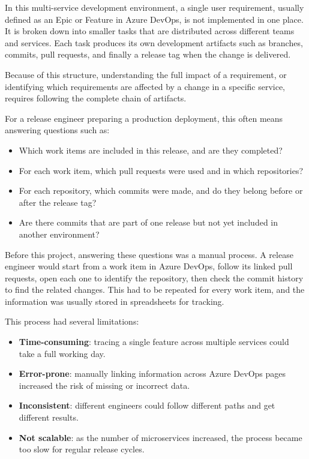 In this multi-service development environment, a single user requirement, usually defined as an Epic or Feature in Azure DevOps, is not implemented in one place. It is broken down into smaller tasks that are distributed across different teams and services. Each task produces its own development artifacts such as branches, commits, pull requests, and finally a release tag when the change is delivered.

Because of this structure, understanding the full impact of a requirement, or identifying which requirements are affected by a change in a specific service, requires following the complete chain of artifacts.

For a release engineer preparing a production deployment, this often means answering questions such as:

\begin{itemize}
  \item Which work items are included in this release, and are they completed?
  \item For each work item, which pull requests were used and in which repositories?
  \item For each repository, which commits were made, and do they belong before or after the release tag?
  \item Are there commits that are part of one release but not yet included in another environment?
\end{itemize}

Before this project, answering these questions was a manual process. A release engineer would start from a work item in Azure DevOps, follow its linked pull requests, open each one to identify the repository, then check the commit history to find the related changes. This had to be repeated for every work item, and the information was usually stored in spreadsheets for tracking.

This process had several limitations:

\begin{itemize}
  \item \textbf{Time-consuming}: tracing a single feature across multiple services could take a full working day.
  \item \textbf{Error-prone}: manually linking information across Azure DevOps pages increased the risk of missing or incorrect data.
  \item \textbf{Inconsistent}: different engineers could follow different paths and get different results.
  \item \textbf{Not scalable}: as the number of microservices increased, the process became too slow for regular release cycles.
\end{itemize}

